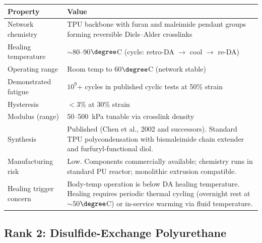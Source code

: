 \documentclass[11pt, a4paper]{article}
\begin{document}
\begin{center}
\begin{tabular}{@{}lp{9cm}@{}}
\toprule
\textbf{Property} & \textbf{Value} \\
\midrule
Network chemistry & TPU backbone with furan and maleimide
  pendant groups forming reversible Diels--Alder crosslinks \\
Healing temperature & $\sim$80--90$\degree$C (cycle:
  retro-DA $\to$ cool $\to$ re-DA) \\
Operating range & Room temp to 60$\degree$C (network stable) \\
Demonstrated fatigue & $10^9$+ cycles in published cyclic tests
  at 50\% strain \\
Hysteresis & $<$3\% at 30\% strain \\
Modulus (range) & 50--500~kPa tunable via crosslink density \\
Synthesis & Published (Chen et al., 2002 and successors).
  Standard TPU polycondensation with bismaleimide chain extender
  and furfuryl-functional diol. \\
\midrule
Manufacturing risk & \textcolor{nm-green}{Low.} Components
  commercially available; chemistry runs in standard PU reactor;
  monolithic extrusion compatible. \\
Healing trigger concern & \textcolor{nm-orange}{Body-temp
  operation is below DA healing temperature. Healing requires
  periodic thermal cycling (overnight rest at $\sim$50$\degree$C)
  or in-service warming via fluid temperature.} \\
\bottomrule
\end{tabular}
\end{center}

\subsection{Rank 2: Disulfide-Exchange Polyurethane}
\end{document}
